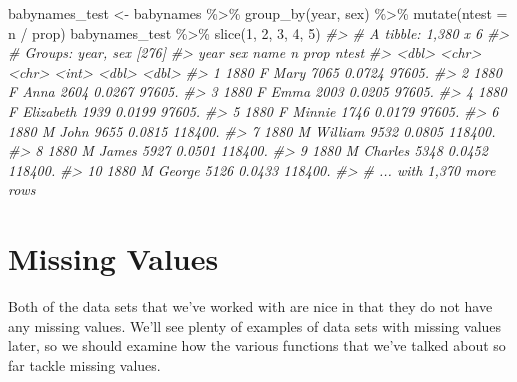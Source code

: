 \documentclass[
]{book}
\newenvironment{Shaded}{\begin{snugshade}}{\end{snugshade}}
\newcommand{\AttributeTok}[1]{\textcolor[rgb]{0.77,0.63,0.00}{#1}}
\newcommand{\CommentTok}[1]{\textcolor[rgb]{0.56,0.35,0.01}{\textit{#1}}}
\newcommand{\DecValTok}[1]{\textcolor[rgb]{0.00,0.00,0.81}{#1}}
\newcommand{\FunctionTok}[1]{\textcolor[rgb]{0.00,0.00,0.00}{#1}}
\newcommand{\NormalTok}[1]{#1}
\newcommand{\OtherTok}[1]{\textcolor[rgb]{0.56,0.35,0.01}{#1}}
\newcommand{\SpecialCharTok}[1]{\textcolor[rgb]{0.00,0.00,0.00}{#1}}
\begin{document}
\begin{Shaded}
\begin{Highlighting}[]
\NormalTok{babynames\_test }\OtherTok{\textless{}{-}}\NormalTok{ babynames }\SpecialCharTok{\%\textgreater{}\%}
  \FunctionTok{group\_by}\NormalTok{(year, sex) }\SpecialCharTok{\%\textgreater{}\%} \FunctionTok{mutate}\NormalTok{(}\AttributeTok{ntest =}\NormalTok{ n }\SpecialCharTok{/}\NormalTok{ prop)}
\NormalTok{babynames\_test }\SpecialCharTok{\%\textgreater{}\%} \FunctionTok{slice}\NormalTok{(}\DecValTok{1}\NormalTok{, }\DecValTok{2}\NormalTok{, }\DecValTok{3}\NormalTok{, }\DecValTok{4}\NormalTok{, }\DecValTok{5}\NormalTok{)}
\CommentTok{\#\textgreater{} \# A tibble: 1,380 x 6}
\CommentTok{\#\textgreater{} \# Groups:   year, sex [276]}
\CommentTok{\#\textgreater{}     year sex   name          n   prop   ntest}
\CommentTok{\#\textgreater{}    \textless{}dbl\textgreater{} \textless{}chr\textgreater{} \textless{}chr\textgreater{}     \textless{}int\textgreater{}  \textless{}dbl\textgreater{}   \textless{}dbl\textgreater{}}
\CommentTok{\#\textgreater{}  1  1880 F     Mary       7065 0.0724  97605.}
\CommentTok{\#\textgreater{}  2  1880 F     Anna       2604 0.0267  97605.}
\CommentTok{\#\textgreater{}  3  1880 F     Emma       2003 0.0205  97605.}
\CommentTok{\#\textgreater{}  4  1880 F     Elizabeth  1939 0.0199  97605.}
\CommentTok{\#\textgreater{}  5  1880 F     Minnie     1746 0.0179  97605.}
\CommentTok{\#\textgreater{}  6  1880 M     John       9655 0.0815 118400.}
\CommentTok{\#\textgreater{}  7  1880 M     William    9532 0.0805 118400.}
\CommentTok{\#\textgreater{}  8  1880 M     James      5927 0.0501 118400.}
\CommentTok{\#\textgreater{}  9  1880 M     Charles    5348 0.0452 118400.}
\CommentTok{\#\textgreater{} 10  1880 M     George     5126 0.0433 118400.}
\CommentTok{\#\textgreater{} \# ... with 1,370 more rows}
\end{Highlighting}
\end{Shaded}

\hypertarget{missing-values}{%
\section{Missing Values}\label{missing-values}}

Both of the data sets that we've worked with are nice in that they do not have any missing values. We'll see plenty of examples of data sets with missing values later, so we should examine how the various functions that we've talked about so far tackle missing values.
\end{document}
